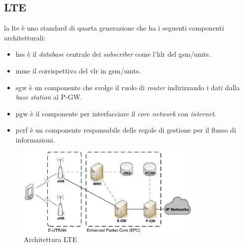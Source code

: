 \subsection{LTE}
la \gls{lte} è uno standard di quarta generazione che ha i seguenti componenti architetturali\cite{lte}:
\begin{itemize}
    \item \gls{hss} è il \textit{database} centrale dei \textit{subscriber} come l'\gls{hlr} del \gls{gsm}/\gls{umts}.
    \item \gls{mme} il corrispettivo del \gls{vlr} in \gls{gsm}/\gls{umts}.
    \item \gls{sgw} è un componente che svolge il ruolo di \textit{router} indirizzando i dati dalla \textit{base station}
    al P-GW.
    \item \gls{pgw} è il componente per interfacciare il \textit{core network} con \textit{internet}.
    \item \gls{pcrf} è un componente responsabile delle regole di gestione per il flusso di informazioni.
\end{itemize}
\begin{figure}[ht]
    \centering
    \includegraphics[width=0.8\textwidth]{images/4g-lte.jpg}
    \caption{Architettura LTE}
\end{figure}

\clearpage

